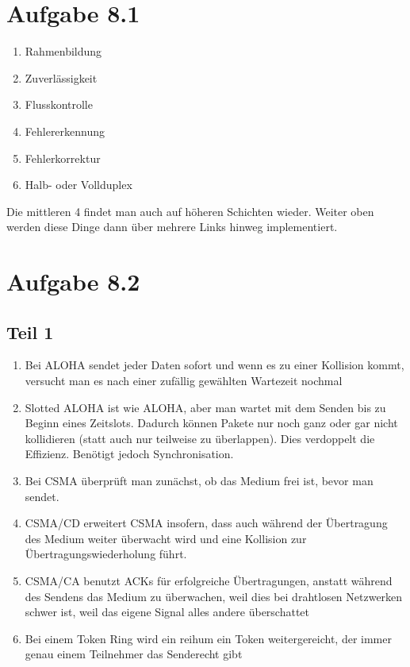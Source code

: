 \documentclass[10pt,a4paper]{article}
\begin{document}
\section{Aufgabe 8.1}

\begin{enumerate}[label={\alph*)}]
\item Rahmenbildung
\item Zuverlässigkeit
\item Flusskontrolle
\item Fehlererkennung
\item Fehlerkorrektur
\item Halb- oder Vollduplex
\end{enumerate}

Die mittleren 4 findet man auch auf höheren Schichten wieder. Weiter oben werden
diese Dinge dann über mehrere Links hinweg implementiert.

\section{Aufgabe 8.2}

\subsection{Teil 1}

\begin{enumerate}[label={\alph*)}]
\item Bei ALOHA sendet jeder Daten sofort und wenn es zu einer Kollision kommt,
  versucht man es nach einer zufällig gewählten Wartezeit nochmal
\item Slotted ALOHA ist wie ALOHA, aber man wartet mit dem Senden bis zu Beginn
  eines Zeitslots. Dadurch können Pakete nur noch ganz oder gar nicht
  kollidieren (statt auch nur teilweise zu überlappen). Dies verdoppelt die
  Effizienz. Benötigt jedoch Synchronisation.
\item Bei CSMA überprüft man zunächst, ob das Medium frei ist, bevor man
  sendet.
\item CSMA/CD erweitert CSMA insofern, dass auch während der Übertragung des
  Medium weiter überwacht wird und eine Kollision zur Übertragungswiederholung
  führt.
\item CSMA/CA benutzt ACKs für erfolgreiche Übertragungen, anstatt während des
  Sendens das Medium zu überwachen, weil dies bei drahtlosen Netzwerken schwer
  ist, weil das eigene Signal alles andere überschattet
\item Bei einem Token Ring wird ein reihum ein Token weitergereicht, der immer
  genau einem Teilnehmer das Senderecht gibt
\end{enumerate}
\end{document}
